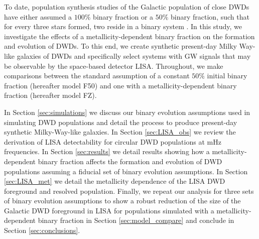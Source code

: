 \documentclass[twocolumn]{aastex631}
\begin{document}

To date, population synthesis studies of the Galactic population of close DWDs have either assumed a $100\%$ binary fraction or a $50\%$ binary fraction, such that for every three stars formed, two reside in a binary system \citep{Nelemans2001a, Yu2013, Korol2017, Lamberts2019}. In this study, we investigate the effects of a metallicity-dependent binary fraction on the formation and evolution of DWDs. To this end, we create synthetic present-day Milky Way-like galaxies of DWDs and specifically select systems with GW signals that may be observable by the space-based detector LISA. Throughout, we make comparisons between the standard assumption of a constant $50\%$ initial binary fraction (hereafter model F50) and one with a metallicity-dependent binary fraction (hereafter model FZ).  

In Section \ref{sec:simulations} we discuss our binary evolution assumptions used in simulating DWD populations and detail the process to produce present-day synthetic Milky-Way-like galaxies. In Section \ref{sec:LISA_obs} we review the derivation of LISA detectability for circular DWD populations at mHz frequencies. In Section \ref{sec:results} we detail results showing how a metallicity-dependent binary fraction affects the formation and evolution of DWD populations assuming a fiducial set of binary evolution assumptions. In Section \ref{sec:LISA_met} we detail the metallicity dependence of the LISA DWD foreground and resolved population. Finally, we repeat our analysis for three sets of binary evolution assumptions to show a robust reduction of the size of the Galactic DWD foreground in LISA for populations simulated with a metallicity-dependent binary fraction in Section \ref{sec:model_compare} and conclude in Section \ref{sec:conclusions}.  
\end{document}

